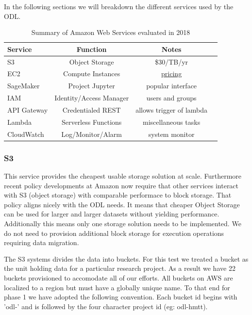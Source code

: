 In the following sections we will breakdown the different services used by the ODL.

\begin{table}[htbp]
\begin{center}
\begin{tabular}{lccr}
\hline
\hline
Service & Function & Notes \\
\hline
\hline
S3 & Object Storage & \$30/TB/yr \\
EC2 & Compute Instances & \href{https://aws.amazon.com/ec2/pricing/on-demand/}{pricing} \\
SageMaker & Project Jupyter & popular interface \\
IAM &  Identity/Access Manager  & users and groups \\
API Gateway & Credentialed REST & allows trigger of lambda \\
Lambda & Serverless Functions & miscellaneous tasks\\
CloudWatch & Log/Monitor/Alarm &  system monitor\\
\hline
\hline
\end{tabular}
\caption[AWS evaluation summary]{Summary of Amazon Web Services evaluated in 2018}
\end{center}
\end{table}

\subsubsection{S3}
This service provides the cheapest usable storage solution at scale. Furthermore recent policy developments at Amazon now require that other services interact with S3 (object storage) with comparable performace to block storage. That policy aligns nicely with the ODL needs. It means that cheaper Object Storage can be used for larger and larger datasets without yielding performance. Additionally this means only one storage solution needs to be implemented. We do not need to provision additional block storage for execution operations requiring data migration.

The S3 systems divides the data into buckets. For this test we treated a bucket as the unit holding data for a particular research project. As a result we have 22 buckets provisioned to accomodate all of our efforts. All buckets on AWS are localized to a region but must have a globally unique name. To that end for phase 1 we have adopted the following convention. Each bucket id begins with 'odl-' and is followed by the four character project id (eg: odl-hmtt).

